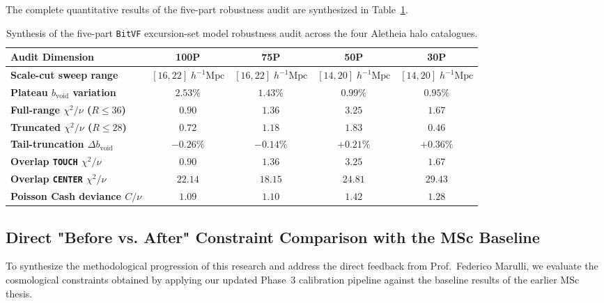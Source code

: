 \documentclass[12pt]{report}
\begin{document}
The complete quantitative results of the five-part robustness audit are synthesized in Table~\ref{tab:bitvf_robustness_summary}.

\begin{table}[H]
    \centering
    \caption{Synthesis of the five-part \texttt{BitVF} excursion-set model robustness audit across the four Aletheia halo catalogues.}
    \label{tab:bitvf_robustness_summary}
    \begin{tabular}{lcccc}
        \toprule
        \textbf{Audit Dimension} & \textbf{100P} & \textbf{75P} & \textbf{50P} & \textbf{30P} \\
        \midrule
        \textbf{Scale-cut sweep range} & $[16, 22]\;h^{-1}\mathrm{Mpc}$ & $[16, 22]\;h^{-1}\mathrm{Mpc}$ & $[14, 20]\;h^{-1}\mathrm{Mpc}$ & $[14, 20]\;h^{-1}\mathrm{Mpc}$ \\
        \textbf{Plateau $b_{\mathrm{void}}$ variation} & $2.53\%$ & $1.43\%$ & $\mathbf{0.99\%}$ & $\mathbf{0.95\%}$ \\
        \midrule
        \textbf{Full-range $\chi^2/\nu$ ($R \le 36$)} & $0.90$ & $1.36$ & $3.25$ & $1.67$ \\
        \textbf{Truncated $\chi^2/\nu$ ($R \le 28$)} & $\mathbf{0.72}$ & $\mathbf{1.18}$ & $\mathbf{1.83}$ & $\mathbf{0.46}$ \\
        \textbf{Tail-truncation $\Delta b_{\mathrm{void}}$} & $-0.26\%$ & $-0.14\%$ & $\mathbf{+0.21\%}$ & $\mathbf{+0.36\%}$ \\
        \midrule
        \textbf{Overlap \texttt{TOUCH} $\chi^2/\nu$} & $0.90$ & $1.36$ & $3.25$ & $1.67$ \\
        \textbf{Overlap \texttt{CENTER} $\chi^2/\nu$} & $\mathbf{22.14}$ & $\mathbf{18.15}$ & $\mathbf{24.81}$ & $\mathbf{29.43}$ \\
        \midrule
        \textbf{Poisson Cash deviance $C/\nu$} & $\mathbf{1.09}$ & $\mathbf{1.10}$ & $\mathbf{1.42}$ & $\mathbf{1.28}$ \\
        \bottomrule
    \end{tabular}
\end{table}

\subsection{Direct "Before vs. After" Constraint Comparison with the MSc Baseline}
\label{sec:before_after_msc_comparison}

To synthesize the methodological progression of this research and address the direct feedback from Prof.~Federico Marulli, we evaluate the cosmological constraints obtained by applying our updated Phase~3 calibration pipeline against the baseline results of the earlier MSc thesis. 
\end{document}
